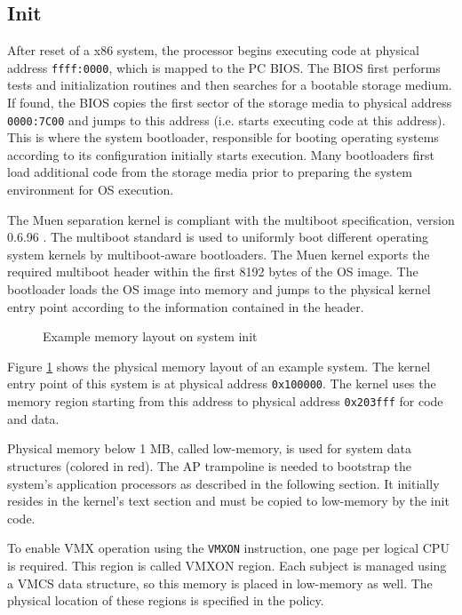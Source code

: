 \subsection{Init}\label{subsec:init}
After reset of a x86 system, the processor begins executing code at physical
address \texttt{ffff:0000}, which is mapped to the PC BIOS. The
BIOS first performs tests and initialization routines and then searches for a
bootable storage medium. If found, the BIOS copies the first sector of the
storage media to physical address \texttt{0000:7C00} and jumps to this address
(i.e. starts executing code at this address). This is where the system
bootloader, responsible for booting operating systems according to its
configuration initially starts execution. Many bootloaders first load additional
code from the storage media prior to preparing the system environment for OS
execution.

The Muen separation kernel is compliant with the multiboot specification,
version 0.6.96 \cite{multiboot}. The multiboot standard is used to uniformly
boot different operating system kernels by multiboot-aware bootloaders. The Muen
kernel exports the required multiboot header within the first 8192 bytes of the
OS image. The bootloader loads the OS image into memory and jumps to the
physical kernel entry point according to the information contained in the
header.

\begin{figure}[h]
	\centering
	
	\caption{Example memory layout on system init}
	\label{fig:init-mem-layout-example}
\end{figure}

Figure \ref{fig:init-mem-layout-example} shows the physical memory layout of an
example system. The kernel entry point of this system is at physical address
\texttt{0x100000}. The kernel uses the memory region starting from this address
to physical address \texttt{0x203fff} for code and data.

Physical memory below 1 MB, called low-memory, is used for system data
structures (colored in red). The AP trampoline is
needed to bootstrap the system's application processors as described in the
following section. It initially resides in the kernel's text section and must
be copied to low-memory by the init code.

To enable VMX operation using the \texttt{VMXON} instruction, one page per
logical CPU is required. This region is called VMXON region. Each
subject is managed using a VMCS data structure, so this memory is
placed in low-memory as well. The physical location of these regions is
specified in the policy.

